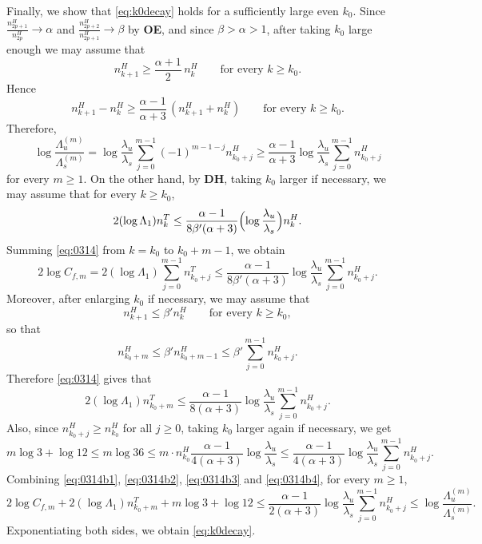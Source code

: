\documentclass{amsart}
\theoremstyle{plain}
\theoremstyle{definition}
\theoremstyle{remark}
\numberwithin{equation}{section}
\begin{document}
Finally, we show that \eqref{eq:k0decay} holds for a sufficiently large even $k_0$.
Since
$
\frac{n_{2p+1}^H}{n_{2p}^H}\to \alpha$ and
$\frac{n_{2p+2}^H}{n_{2p+1}^H}\to \beta$ by {\bf OE},
 and since $\beta>\alpha>1$, after taking $k_0$ large enough we may assume that
\[
n_{k+1}^H\ge \frac{\alpha+1}{2}\,n_k^H
\qquad\text{for every }k\ge k_0.
\]
Hence
\[
n_{k+1}^H-n_k^H
\ge
\frac{\alpha-1}{\alpha+3}\,(n_{k+1}^H+n_k^H)
\qquad\text{for every }k\ge k_0.
\]
Therefore,
\begin{equation}\label{eq:0314b1}
\log\frac{\Lambda_u^{(m)}}{\Lambda_s^{(m)}}
=
\log\frac{\lambda_u}{\lambda_s}
\sum_{j=0}^{m-1}(-1)^{m-1-j}n_{k_0+j}^H
\ge
\frac{\alpha-1}{\alpha+3}\log\frac{\lambda_u}{\lambda_s}
\sum_{j=0}^{m-1}n_{k_0+j}^H
\end{equation}
for every $m\ge1$.
On the other hand, by {\bf DH}, taking $k_0$ larger if necessary, we may assume that for every $k\ge k_0$,
\begin{equation}\label{eq:0314}
2(\log\Lambda_1)n_k^T
\le
\frac{\alpha-1}{8\beta'(\alpha+3)}\Bigl(\log\frac{\lambda_u}{\lambda_s}\Bigr)n_k^H.
\end{equation}
Summing \eqref{eq:0314} from $k=k_0$ to $k_0+m-1$, we obtain
\begin{equation}\label{eq:0314b2}
2\log C_{f,m}
=
2(\log\Lambda_1)\sum_{j=0}^{m-1}n_{k_0+j}^T
\le
\frac{\alpha-1}{8\beta'(\alpha+3)}\log\frac{\lambda_u}{\lambda_s}
\sum_{j=0}^{m-1}n_{k_0+j}^H .
\end{equation}
Moreover,
after enlarging $k_0$ if necessary, we may assume that
\[
n_{k+1}^H\le \beta' n_k^H
\qquad\text{for every }k\ge k_0,
\]
so that
\[
n_{k_0+m}^H\le \beta' n_{k_0+m-1}^H
\le
\beta'\sum_{j=0}^{m-1}n_{k_0+j}^H.
\]
Therefore \eqref{eq:0314} gives that
\begin{equation}\label{eq:0314b3}
2(\log\Lambda_1)n_{k_0+m}^T
\le
\frac{\alpha-1}{8(\alpha+3)}\log\frac{\lambda_u}{\lambda_s}
\sum_{j=0}^{m-1}n_{k_0+j}^H .
\end{equation}
Also, since $n_{k_0+j}^H\ge n_{k_0}^H$ for all $j\ge0$, taking $k_0$ larger again if necessary, we get
\begin{equation}\label{eq:0314b4}
m\log 3+\log 12
\le
m\log 36
\le
m\cdot n_{k_0}^H\frac{\alpha-1}{4(\alpha+3)}\log\frac{\lambda_u}{\lambda_s}
\le
\frac{\alpha-1}{4(\alpha+3)}\log\frac{\lambda_u}{\lambda_s}
\sum_{j=0}^{m-1}n_{k_0+j}^H .
\end{equation}
Combining \eqref{eq:0314b1}, \eqref{eq:0314b2}, \eqref{eq:0314b3} and \eqref{eq:0314b4}, for every $m\ge1$,
\[
2\log C_{f,m}+2(\log\Lambda_1)n_{k_0+m}^T+m\log 3+\log 12
\le
\frac{\alpha-1}{2(\alpha+3)}\log\frac{\lambda_u}{\lambda_s}
\sum_{j=0}^{m-1}n_{k_0+j}^H
\le
\log\frac{\Lambda_u^{(m)}}{\Lambda_s^{(m)}}.
\]
Exponentiating both sides, we obtain \eqref{eq:k0decay}.
\end{document}
